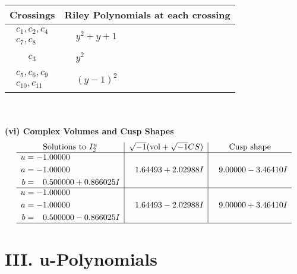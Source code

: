 \documentclass[1p]{elsarticle_modified}
\theoremstyle{definition}
\newcommand{\I}{\sqrt{-1}}
\begin{document}
\begin{tabular}{m{50pt}|m{274pt}}
Crossings & \hspace{64pt}Riley Polynomials at each crossing \\
\hline $$\begin{aligned}c_{1},c_{2},c_{4}\\c_{7},c_{8}\end{aligned}$$&$\begin{aligned}
&y^2+y+1
\end{aligned}$\\
\hline $$\begin{aligned}c_{3}\end{aligned}$$&$\begin{aligned}
&y^2
\end{aligned}$\\
\hline $$\begin{aligned}c_{5},c_{6},c_{9}\\c_{10},c_{11}\end{aligned}$$&$\begin{aligned}
&(y-1)^2
\end{aligned}$\\
\hline
\end{tabular}\\~\\
\newpage\flushleft \textbf{(vi) Complex Volumes and Cusp Shapes}
$$\begin{array}{c|c|c}  
\text{Solutions to }I^u_{2}& \I (\text{vol} + \sqrt{-1}CS) & \text{Cusp shape}\\
 \hline 
\begin{aligned}
u &= -1.00000\phantom{ +0.000000I} \\
a &= -1.00000\phantom{ +0.000000I} \\
b &= \phantom{-}0.500000 + 0.866025 I\end{aligned}
 & \phantom{-}1.64493 + 2.02988 I & \phantom{-}9.00000 - 3.46410 I \\ \hline\begin{aligned}
u &= -1.00000\phantom{ +0.000000I} \\
a &= -1.00000\phantom{ +0.000000I} \\
b &= \phantom{-}0.500000 - 0.866025 I\end{aligned}
 & \phantom{-}1.64493 - 2.02988 I & \phantom{-}9.00000 + 3.46410 I\\
 \hline 
 \end{array}$$\newpage
\newpage\renewcommand{\arraystretch}{1}
\centering \section*{ III. u-Polynomials}
\end{document}
